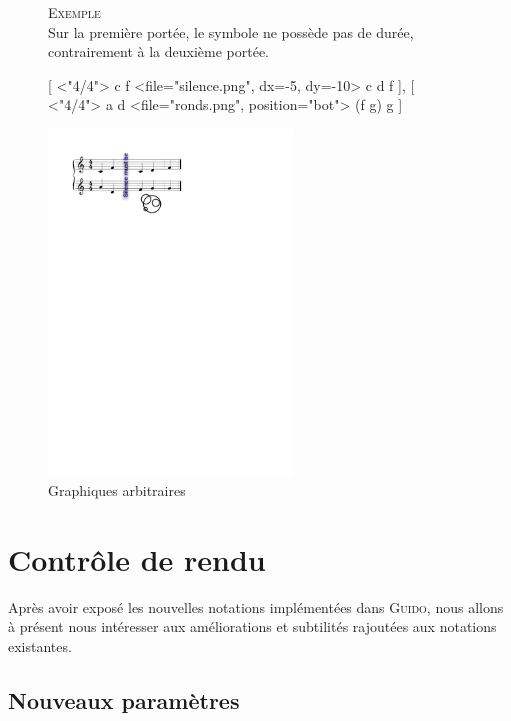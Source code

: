 \documentclass{article}
\newenvironment{gmncode}	{\vspace{-2mm}\small\verbatim}{\endverbatim\vspace{-2mm}}
\newcommand{\guido}			{\textsc{Guido}}
\newcommand{\exemple}		{\vspace{2mm}\hspace*{-3mm}\textsc{Exemple}}
\begin{document}
\begin{figure}[h]
\exemple\\
Sur la première portée, le symbole ne possède pas de durée, contrairement à la deuxième portée.

\begin{gmncode}
{
  [
    \meter<"4/4"> c f
    \symbol<file="silence.png", dx=-5,
        dy=-10> 
    c d f
  ],
  [
    \meter<"4/4"> a d
    \symbol<file="ronds.png",
        position="bot"> (f g) g
  ]
}
\end{gmncode}
\begin{center}
\includegraphics[width=65mm]{img/partitions/symbol.pdf}
\end{center}
\caption{Graphiques arbitraires}
\label{fig:symbol}
\end{figure}

\newpage

\section{Contr\^ole de rendu}\label{sec:controleRendu}

Après avoir exposé les nouvelles notations implémentées dans \guido{}, nous allons à présent nous intéresser aux améliorations et subtilités rajoutées aux notations existantes.

\subsection{Nouveaux paramètres}\label{subsubsec:attributs}
\end{document}
